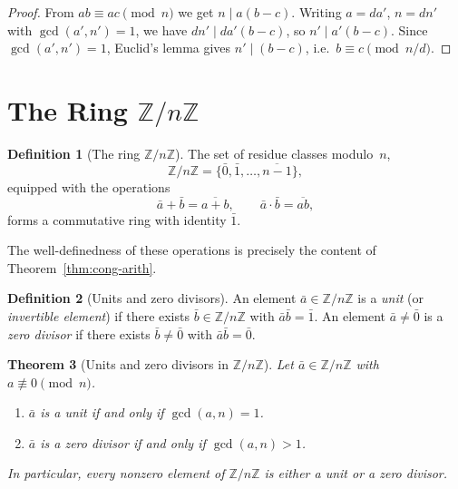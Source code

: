 \documentclass[12pt,a4paper,openany]{book}
\theoremstyle{definition}
\newtheorem{definition}{Definition}[chapter]
\theoremstyle{plain}
\newtheorem{theorem}[definition]{Theorem}
\theoremstyle{remark}
\newcommand{\Z}{\mathbb{Z}}
\begin{document}
\begin{proof}
From $ab \equiv ac \pmod{n}$ we get $n \mid a(b-c)$.  Writing $a = da'$,
$n = dn'$ with $\gcd(a', n') = 1$, we have $dn' \mid da'(b-c)$, so
$n' \mid a'(b-c)$.  Since $\gcd(a', n') = 1$, Euclid's lemma gives
$n' \mid (b - c)$, i.e.\ $b \equiv c \pmod{n/d}$.
\end{proof}

\section{The Ring $\Z/n\Z$}
\label{sec:ZnZ}
\index{Z/nZ@$\Z/n\Z$}

\begin{definition}[The ring $\Z/n\Z$]
\label{def:ZnZ}
The set of residue classes modulo~$n$,
\[
  \Z/n\Z = \{ \bar{0}, \bar{1}, \dots, \overline{n-1} \},
\]
equipped with the operations
\[
  \bar{a} + \bar{b} = \overline{a+b}, \qquad
  \bar{a} \cdot \bar{b} = \overline{ab},
\]
forms a commutative ring with identity $\bar{1}$.
\end{definition}

The well-definedness of these operations is precisely the content of
Theorem~\ref{thm:cong-arith}.

\begin{definition}[Units and zero divisors]
\label{def:units-zerodiv}
An element $\bar{a} \in \Z/n\Z$ is a \emph{unit} (or \emph{invertible element})
if there exists $\bar{b} \in \Z/n\Z$ with $\bar{a}\bar{b} = \bar{1}$.
An element $\bar{a} \neq \bar{0}$ is a \emph{zero divisor} if there exists
$\bar{b} \neq \bar{0}$ with $\bar{a}\bar{b} = \bar{0}$.
\end{definition}

\begin{theorem}[Units and zero divisors in $\Z/n\Z$]
\label{thm:units-ZnZ}
\index{Z/nZ@$\Z/n\Z$!units}
Let $\bar{a} \in \Z/n\Z$ with $a \not\equiv 0 \pmod{n}$.
\begin{enumerate}[label=(\roman*)]
  \item $\bar{a}$ is a unit if and only if $\gcd(a,n)=1$.
  \item $\bar{a}$ is a zero divisor if and only if $\gcd(a,n)>1$.
\end{enumerate}
In particular, every nonzero element of $\Z/n\Z$ is either a unit or
a zero divisor.
\end{theorem}
\end{document}
